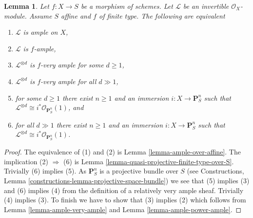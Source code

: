 \documentclass[10pt,a4paper]{amsart}
\theoremstyle{plain}
\newtheorem{lemma}[subsection]{Lemma}
\theoremstyle{definition}
\theoremstyle{remark}
\numberwithin{equation}{subsection}
\begin{document}
\begin{lemma}
\label{lemma-finite-type-over-affine-ample-very-ample}
Let $f : X \to S$ be a morphism of schemes.
Let $\mathcal{L}$ be an invertible $\mathcal{O}_X$-module.
Assume $S$ affine and $f$ of finite type.
The following are equivalent
\begin{enumerate}
\item $\mathcal{L}$ is ample on $X$,
\item $\mathcal{L}$ is $f$-ample,
\item $\mathcal{L}^{\otimes d}$ is $f$-very ample for some $d \geq 1$,
\item $\mathcal{L}^{\otimes d}$ is $f$-very ample for all $d \gg 1$,
\item for some $d \geq 1$ there exist $n \geq 1$ and an immersion
$i : X \to \mathbf{P}^n_S$ such that
$\mathcal{L}^{\otimes d} \cong i^*\mathcal{O}_{\mathbf{P}^n_S}(1)$, and
\item for all $d \gg 1$ there exist $n \geq 1$ and an immersion
$i : X \to \mathbf{P}^n_S$ such that
$\mathcal{L}^{\otimes d} \cong i^*\mathcal{O}_{\mathbf{P}^n_S}(1)$.
\end{enumerate}
\end{lemma}

\begin{proof}
The equivalence of (1) and (2) is Lemma \ref{lemma-ample-over-affine}.
The implication (2) $\Rightarrow$ (6) is
Lemma \ref{lemma-quasi-projective-finite-type-over-S}.
Trivially (6) implies (5).
As $\mathbf{P}^n_S$ is a projective bundle over $S$ (see
Constructions, Lemma \ref{constructions-lemma-projective-space-bundle})
we see that
(5) implies (3) and (6) implies (4) from the definition of a
relatively very ample sheaf.
Trivially (4) implies (3). To finish we have to show that
(3) implies (2) which follows from Lemma \ref{lemma-ample-very-ample}
and Lemma \ref{lemma-ample-power-ample}.
\end{proof}
\end{document}
